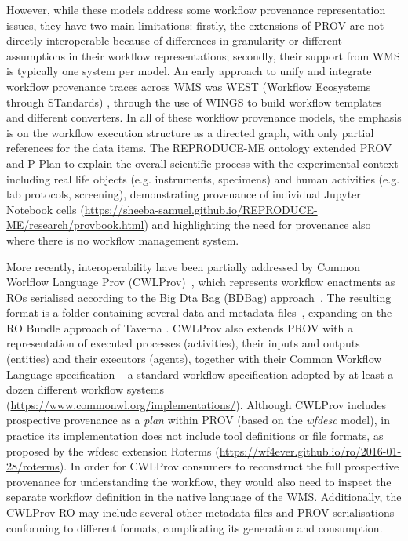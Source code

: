 \documentclass[10pt,letterpaper]{article}
\begin{document}
However, while these models address some workflow provenance representation issues, they have two main limitations: firstly, the extensions of PROV are not directly interoperable because of differences in granularity or different assumptions in their workflow representations; secondly, their support from WMS is typically one system per model.  An early approach to unify and integrate workflow provenance traces across WMS was WEST (Workflow Ecosystems through STandards) \cite{Garijo 2014}, through the use of WINGS \cite{Gil 2011} to build workflow templates and different converters. In all of these workflow provenance models, the emphasis is on the workflow execution structure as a directed graph, with only partial references for the data items. 
The REPRODUCE-ME ontology \cite{Samuel 2022} extended PROV and P-Plan to explain the overall scientific process with the experimental context including real life objects (e.g. instruments, specimens) and human activities (e.g. lab protocols, screening), demonstrating provenance of individual Jupyter Notebook cells (\url{https://sheeba-samuel.github.io/REPRODUCE-ME/research/provbook.html}) and highlighting the need for provenance also where there is no workflow management system. 

More recently, interoperability have been partially addressed by Common Worlflow Language Prov (CWLProv)~\cite{Khan 2019}, which represents workflow enactments as ROs serialised according to the Big Dta Bag (BDBag) approach~\cite{Chard 2016}.
The resulting format is a folder containing several data and metadata files~\cite{Soiland-Reyes 2018}, expanding on the RO Bundle approach of Taverna \cite{Soiland-Reyes 2016}.
CWLProv also extends PROV with a representation of executed processes (activities), their inputs and outputs (entities) and their executors (agents), together with their Common Workflow Language specification
\cite{Crusoe 2022} -- a standard workflow specification adopted by at least a dozen different workflow systems (\url{https://www.commonwl.org/implementations/}). Although CWLProv includes prospective provenance as a \emph{plan}
within PROV (based on the \emph{wfdesc} model), in practice its implementation does not include tool definitions or file formats, as proposed by the wfdesc extension Roterms (\url{https://wf4ever.github.io/ro/2016-01-28/roterms}).
In order for CWLProv consumers to reconstruct the full prospective provenance for understanding the workflow, they would also need to inspect the separate workflow definition in the native language of the WMS.
Additionally, the CWLProv RO may include several other metadata files and PROV serialisations conforming to different formats, complicating its generation and consumption.
\end{document}

